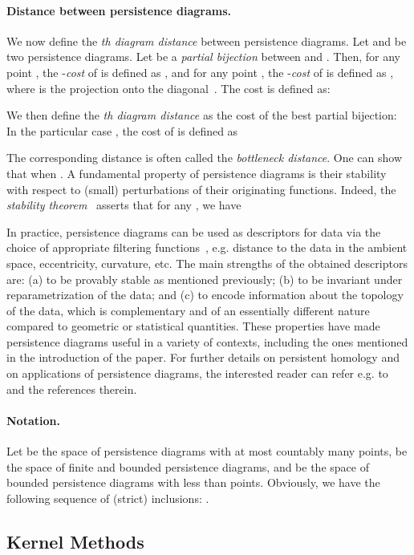 \documentclass[11pt]{article}
\begin{document}
\paragraph*{Distance between persistence diagrams.}
We now define the {\em th diagram distance} between persistence diagrams.
Let  and  be two persistence diagrams. 
Let  be a {\em partial bijection} between  and .
Then, for any point , the -{\em cost} of  is defined as ,
and for any point , the -{\em cost} of  is defined as 
, where  is the projection 
onto the diagonal~.
The cost  is defined as:

We then define the {\em th diagram distance}
  as the cost of the best partial bijection: 
In the particular case , the cost of  is defined as 

The corresponding distance  is often called the {\em bottleneck distance}.
One can show that  when .
A fundamental property of persistence diagrams is their stability with
respect to (small) perturbations of their originating functions.
Indeed, the {\em stability theorem}~\cite{Bauer13b,Chazal09a,Chazal16a,Cohen07}
asserts that 
for any
, we have


In practice, persistence diagrams can be used as descriptors for data
via the choice of appropriate filtering functions~, e.g.  distance
to the data in the ambient space, eccentricity, curvature, etc. The
main strengths of the obtained descriptors are: (a) to be provably stable as
 mentioned previously; (b) to be invariant under reparametrization of the
data; and (c) to encode information about the topology of the data,
which is complementary and of an essentially different nature compared
to geometric or statistical quantities.
These properties have made persistence diagrams useful in a variety of
contexts, including the ones mentioned in the introduction of the
paper.
For further details on persistent homology and on applications of
persistence diagrams, the interested reader can refer
e.g. to~\cite{Oudot15} and the references therein.

\paragraph{Notation.} Let  be the space of persistence diagrams with at most countably many points,
 be the space of finite and bounded persistence diagrams, and
 be the space of bounded persistence diagrams with less than  points.
Obviously, we have the following sequence of (strict) inclusions: .


\subsection{Kernel Methods}
\label{sec:kernelMethods}
\end{document}
